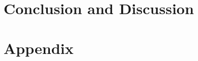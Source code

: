\section{Conclusion and Discussion}\label{section:opg-conclusion}





\section*{Appendix}\label{section:opg-appendix}





